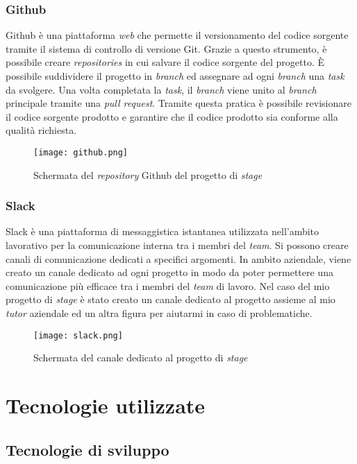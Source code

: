 \subsubsection{Github}
Github è una piattaforma \textit{web} che permette il versionamento del codice sorgente tramite il sistema di controllo di versione Git. 
Grazie a questo strumento, è possibile creare \textit{repositories} in cui salvare il codice sorgente del progetto. 
È possibile suddividere il progetto in \textit{branch} ed assegnare ad ogni \textit{branch} una \textit{task} da svolgere. Una volta completata la \textit{task}, il \textit{branch} viene unito al \textit{branch} principale tramite una \textit{pull request}. 
Tramite questa pratica è possibile revisionare il codice sorgente prodotto e garantire che il codice prodotto sia conforme alla qualità richiesta.
\begin{figure}[H]
    \centering
    \texttt{[image: github.png]}
    \caption{Schermata del \textit{repository} Github del progetto di \textit{stage}}
    \label{fig:Github}
\end{figure}
\subsubsection{Slack}
Slack è una piattaforma di messaggistica istantanea utilizzata nell'ambito lavorativo per la comunicazione interna tra i membri del \textit{team}.
Si possono creare canali di comunicazione dedicati a specifici argomenti. In ambito aziendale, viene creato un canale dedicato ad ogni progetto in modo da poter permettere una comunicazione più efficace tra i membri del \textit{team} di lavoro.
Nel caso del mio progetto di \textit{stage} è stato creato un canale dedicato al progetto assieme al mio \textit{tutor} aziendale ed un altra figura per aiutarmi in caso di problematiche.
\begin{figure}[H]
    \centering
    \texttt{[image: slack.png]}
    \caption{Schermata del canale dedicato al progetto di \textit{stage}}
    \label{fig:Slack}
\end{figure}

\section{Tecnologie utilizzate}
\subsection{Tecnologie di sviluppo}
